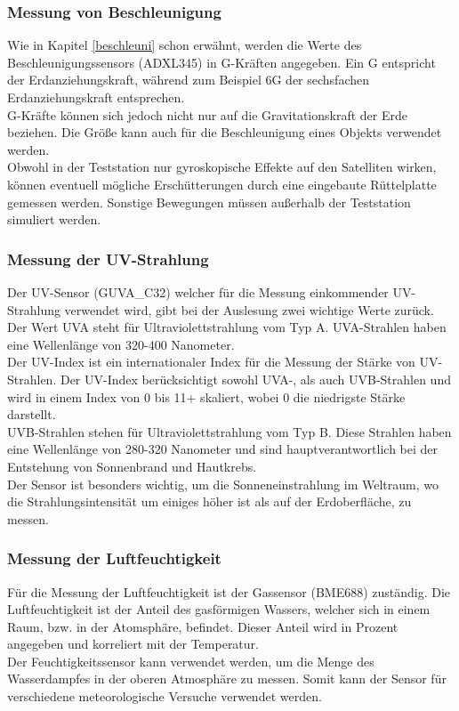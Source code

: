 \subsubsection{Messung von Beschleunigung}
Wie in Kapitel \ref{beschleuni} schon erwähnt, werden die Werte des Beschleunigungssensors (ADXL345) in G-Kräften angegeben. Ein G entspricht der Erdanziehungskraft, während zum Beispiel 6G der sechsfachen Erdanziehungskraft entsprechen. \\
\vspace{3mm}
G-Kräfte können sich jedoch nicht nur auf die Gravitationskraft der Erde beziehen. Die Größe kann auch für die Beschleunigung eines Objekts verwendet werden. \\
\vspace{3mm}
Obwohl in der Teststation nur gyroskopische Effekte auf den Satelliten wirken, können eventuell mögliche Erschütterungen durch eine eingebaute Rüttelplatte gemessen werden. Sonstige Bewegungen müssen außerhalb der Teststation simuliert werden.

\subsubsection{Messung der UV-Strahlung}\label{messuv}
Der UV-Sensor (GUVA\_C32) welcher für die Messung einkommender UV-Strahlung verwendet wird, gibt bei der Auslesung zwei wichtige Werte zurück.\\
\vspace{3mm}
Der Wert UVA steht für Ultraviolettstrahlung vom Typ A. UVA-Strahlen haben eine Wellenlänge von 320-400 Nanometer.\\
\vspace{3mm}
Der UV-Index ist ein internationaler Index für die Messung der Stärke von UV-Strahlen. Der UV-Index berücksichtigt sowohl UVA-, als auch UVB-Strahlen und wird in einem Index von 0 bis 11+ skaliert, wobei 0 die niedrigste Stärke darstellt.\\
\vspace{3mm}
UVB-Strahlen stehen für Ultraviolettstrahlung vom Typ B. Diese Strahlen haben eine Wellenlänge von 280-320 Nanometer und sind hauptverantwortlich bei der Entstehung von Sonnenbrand und Hautkrebs.\\
\vspace{3mm}
Der Sensor ist besonders wichtig, um die Sonneneinstrahlung im Weltraum, wo die Strahlungsintensität um einiges höher ist als auf der Erdoberfläche, zu messen. 

\subsubsection{Messung der Luftfeuchtigkeit}
Für die Messung der Luftfeuchtigkeit ist der Gassensor (BME688) zuständig. Die Luftfeuchtigkeit ist der Anteil des gasförmigen Wassers, welcher sich in einem Raum, bzw. in der Atomsphäre, befindet. Dieser Anteil wird in Prozent angegeben und korreliert mit der Temperatur.\\
\vspace{3mm}
Der Feuchtigkeitssensor kann verwendet werden, um die Menge des Wasserdampfes in der oberen Atmosphäre zu messen. Somit kann der Sensor für verschiedene meteorologische Versuche verwendet werden. 

